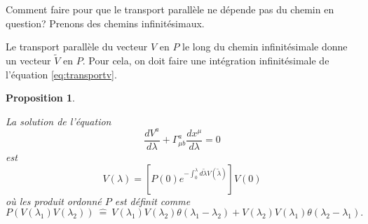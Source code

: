 \documentclass[a4paper,11pt]{report}
\theoremstyle{definition}
\theoremstyle{plain}
\newtheorem{prop}[thm]{Proposition}
\theoremstyle{definition}
\theoremstyle{remark}
\begin{document}
                Comment faire pour que le transport parallèle ne dépende pas du chemin en question? Prenons des chemins infinitésimaux.
                
                Le transport parallèle du vecteur $V$ en $P$ le long du chemin infinitésimale donne un vecteur $\widetilde{V}$ en $P$. Pour cela, on doit faire une intégration infinitésimale de l'équation \ref{eq:transportv}.
                
                \begin{prop}\begin{leftbar}
                    La solution de l'équation
                    \begin{equation}
                        \frac{dV^a}{d\lambda} + \Gamma^a_{\mu b}\frac{dx^\mu}{d\lambda} = 0
                    \end{equation}
                    est 
                    \begin{equation}
                        V(\lambda) = \left[P(0)e^{-\int_0^\lambda d\widetilde{\lambda}V(\widetilde{\lambda})}\right]V(0)
                    \end{equation}
                    où les \textit{produit ordonné} $P$ est définit comme
                    \begin{equation}
                        P\left(V(\lambda_1)V(\lambda_2)\right) ~\hat{=}~ V(\lambda_1) V(\lambda_2)\theta(\lambda_1-\lambda_2)+V(\lambda_2) V(\lambda_1)\theta(\lambda_2-\lambda_1).
                    \end{equation}
                \end{leftbar}\end{prop}
                
\end{document}
